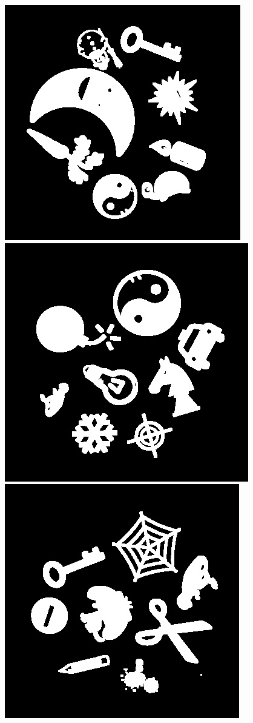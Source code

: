 \documentclass[10pt,a4paper]{article}
\begin{document}
\begin{center}
\includegraphics[scale=0.25]{2.1/2.jpg}
\includegraphics[scale=0.25]{2.1/3.jpg}
\includegraphics[scale=0.25]{2.1/4.jpg}

\end{center}
\end{document}
